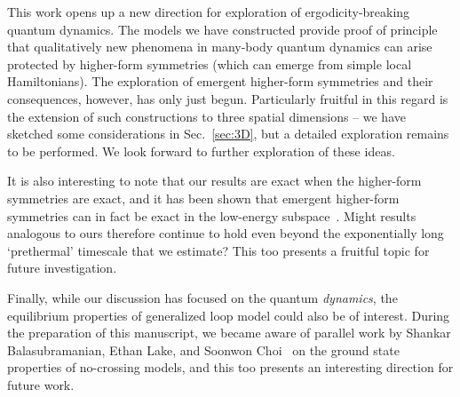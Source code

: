 This work opens up a new direction for exploration of ergodicity-breaking quantum dynamics. The models we have constructed provide proof of principle that qualitatively new phenomena in many-body quantum dynamics can arise protected by higher-form symmetries (which can emerge from simple local Hamiltonians). The exploration of emergent higher-form symmetries and their consequences, however, has only just begun. Particularly fruitful in this regard is the extension of such constructions to three spatial dimensions -- we have sketched some considerations in Sec.~\ref{sec:3D}, but a detailed exploration remains to be performed. We look forward to further exploration of these ideas. 

It is also interesting to note that our results are exact when the higher-form symmetries are exact, and it has been shown that emergent higher-form symmetries can in fact be exact in the low-energy subspace~\cite{McGreevy2022Generalized, Pace2023Exact}. Might results analogous to ours therefore continue to hold even beyond the exponentially long `prethermal' timescale that we estimate? This too presents a fruitful topic for future investigation.

Finally, while our discussion has focused on the quantum \emph{dynamics}, the equilibrium properties of generalized loop model could also be of interest. During the preparation of this manuscript, we became aware of parallel work by Shankar Balasubramanian, Ethan Lake, and Soonwon Choi~\cite{Lake2023NoCrossing} on the ground state properties of no-crossing models, and this too presents an interesting direction for future work. 




